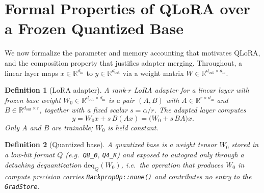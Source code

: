 \documentclass[11pt]{article}
\newtheorem{definition}{Definition}
\begin{document}
\section{Formal Properties of QLoRA over a Frozen Quantized Base}
\label{sec:formal}

We now formalize the parameter and memory accounting that motivates QLoRA, and the composition property that justifies adapter merging. Throughout, a linear layer maps $x \in \mathbb{R}^{d_{\text{in}}}$ to $y \in \mathbb{R}^{d_{\text{out}}}$ via a weight matrix $W \in \mathbb{R}^{d_{\text{out}} \times d_{\text{in}}}$.

\begin{definition}[LoRA adapter]
\label{def:lora}
A rank-$r$ LoRA adapter for a linear layer with frozen base weight $W_0 \in \mathbb{R}^{d_{\text{out}} \times d_{\text{in}}}$ is a pair $(A, B)$ with $A \in \mathbb{R}^{r \times d_{\text{in}}}$ and $B \in \mathbb{R}^{d_{\text{out}} \times r}$, together with a fixed scalar $s = \alpha/r$. The adapted layer computes
\[
y = W_0 x + s\, B (A x) = \bigl(W_0 + s\, B A\bigr) x .
\]
Only $A$ and $B$ are trainable; $W_0$ is held constant.
\end{definition}

\begin{definition}[Quantized base]
\label{def:qbase}
A \emph{quantized base} is a weight tensor $W_0$ stored in a low-bit format $Q$ (e.g.\ \texttt{Q8\_0}, \texttt{Q4\_K}) and exposed to autograd only through a detaching dequantization $\mathrm{deq}_Q(W_0)$, i.e.\ the operation that produces $W_0$ in compute precision carries \texttt{BackpropOp::none()} and contributes no entry to the \texttt{GradStore}.
\end{definition}
\end{document}
